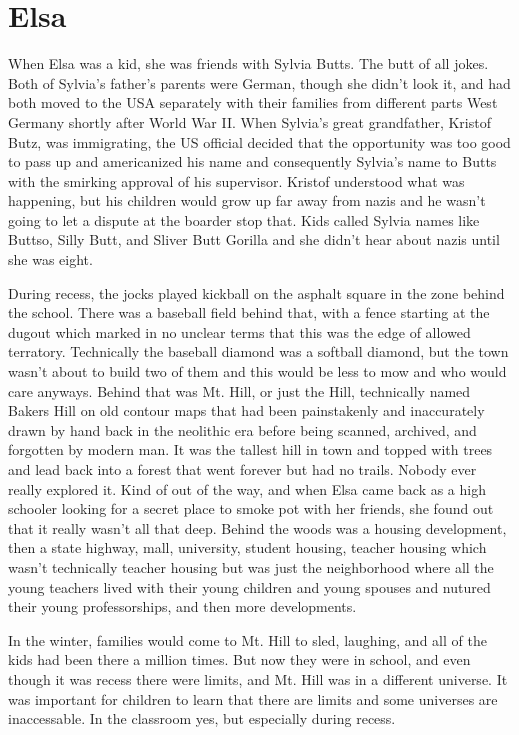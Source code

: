\chapter*{Elsa}
  When Elsa was a kid, she was friends with Sylvia Butts. The butt of all jokes. Both of Sylvia's father's parents were German, though she didn't look it, and had both moved to the USA separately with their families from different parts West Germany shortly after World War II. When Sylvia's great grandfather, Kristof Butz, was immigrating, the US official decided that the opportunity was too good to pass up and americanized his name and consequently Sylvia's name to Butts with the smirking approval of his supervisor. Kristof understood what was happening, but his children would grow up far away from nazis and he wasn't going to let a dispute at the boarder stop that. Kids called Sylvia names like Buttso, Silly Butt, and Sliver Butt Gorilla and she didn't hear about nazis until she was eight. 

 During recess, the jocks played kickball on the asphalt square in the zone behind the school. There was a baseball field behind that, with a fence starting at the dugout which marked in no unclear terms that this was the edge of allowed terratory. Technically the baseball diamond was a softball diamond, but the town wasn't about to build two of them and this would be less to mow and who would care anyways. Behind that was Mt. Hill, or just the Hill, technically named Bakers Hill on old contour maps that had been painstakenly and inaccurately drawn by hand back in the neolithic era before being scanned, archived, and forgotten by modern man. It was the tallest hill in town and topped with trees and lead back into a forest that went forever but had no trails. Nobody ever really explored it. Kind of out of the way, and when Elsa came back as a high schooler looking for a secret place to smoke pot with her friends, she found out that it really wasn't all that deep. Behind the woods was a housing development, then a state highway, mall, university, student housing, teacher housing which wasn't technically teacher housing but was just the neighborhood where all the young teachers lived with their young children and young spouses and nutured their young professorships, and then more developments.

  In the winter, families would come to Mt. Hill to sled, laughing, and all of the kids had been there a million times. But now they were in school, and even though it was recess there were limits, and Mt. Hill was in a different universe. It was important for children to learn that there are limits and some universes are inaccessable. In the classroom yes, but especially during recess.

